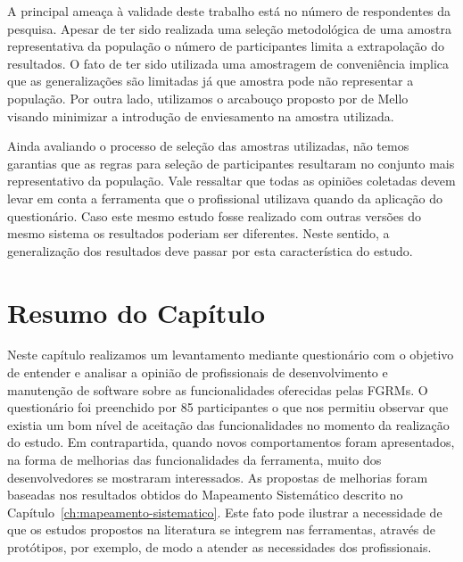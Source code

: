 A principal ameaça à validade deste trabalho está no número de respondentes da
pesquisa. Apesar de ter sido realizada uma seleção metodológica de uma amostra
representativa da população o número de participantes limita a extrapolação do
resultados. O fato de ter sido utilizada uma amostragem de conveniência implica
que as generalizações são limitadas já que amostra pode não representar a
população. Por outra lado, utilizamos o arcabouço proposto por de
Mello~\cite{de2014towards} visando minimizar a introdução de enviesamento na
amostra utilizada.

Ainda avaliando o processo de seleção das amostras utilizadas, não temos
garantias que as regras para seleção de participantes resultaram no conjunto
mais representativo da população. Vale ressaltar que todas as opiniões coletadas
devem levar em conta a ferramenta que o profissional utilizava quando da
aplicação do questionário. Caso este mesmo estudo fosse realizado com outras
versões do mesmo sistema os resultados poderiam ser diferentes. Neste sentido, a
generalização dos resultados deve passar por esta característica do estudo.

\section{Resumo do Capítulo}
\label{sec:resumo_do_capitulo}

Neste capítulo realizamos um levantamento mediante questionário com o objetivo
de entender e analisar a opinião de profissionais de desenvolvimento e
manutenção de software sobre as funcionalidades oferecidas pelas FGRMs. O
questionário foi preenchido por 85 participantes o que nos permitiu observar que
existia um bom nível de aceitação das funcionalidades no momento da realização
do estudo. Em contrapartida, quando novos comportamentos foram apresentados, na
forma de melhorias das funcionalidades da ferramenta, muito dos desenvolvedores
se mostraram interessados. As propostas de melhorias foram baseadas nos
resultados obtidos do Mapeamento Sistemático descrito no
Capítulo~\ref{ch:mapeamento-sistematico}. Este fato pode ilustrar a necessidade
de que os estudos propostos na literatura se integrem nas ferramentas, através
de protótipos, por exemplo, de modo a atender as necessidades dos profissionais.
